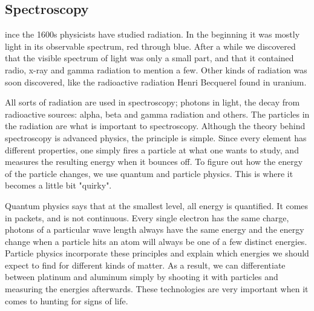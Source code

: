 \subsection{Spectroscopy}
ince the 1600s physicists have studied radiation.
In the beginning it was mostly light in its observable spectrum, red through blue.
After a while we discovered that the visible spectrum of light was only a small part, and that it contained radio, x-ray and gamma radiation to mention a few.
Other kinds of radiation was soon discovered, like the radioactive radiation Henri Becquerel \cite{First_radioactivity} found in uranium.

All sorts of radiation are used in spectroscopy; photons in light, the decay from radioactive sources: alpha, beta and gamma radiation and others.
The particles in the radiation are what is important to spectroscopy.
Although the theory behind spectroscopy is advanced physics, the principle is simple.
Since every element has different properties, one simply fires a particle at what one wants to study, and measures the resulting energy when it bounces off.
To figure out how the energy of the particle changes, we use quantum and particle physics.
This is where it becomes a little bit "quirky".

Quantum physics says that at the smallest level, all energy is quantified.
It comes in packets, and is not continuous.
Every single electron has the same charge, photons of a particular wave length always have the same energy and the energy change when a particle hits an atom will always be one of a few distinct energies.
Particle physics incorporate these principles and explain which energies we should expect to find for different kinds of matter.
As a result, we can differentiate between platinum and aluminum simply by shooting it with particles and measuring the energies afterwards.
These technologies are very important when it comes to hunting for signs of life.
